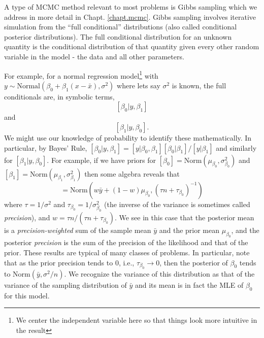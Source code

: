 A type of MCMC method relevant to most problems is Gibbs sampling 
\citep{geman_geman:1984} which we address in more detail in Chapt. \ref{chapt.mcmc}.
Gibbs sampling 
involves 
iterative simulation from the ``full
conditional'' 
distributions (also called conditional posterior
distributions). The full conditional distribution for an unknown
quantity is the conditional distribution of that quantity given every
other random variable in the model - the data and all other
parameters. 
For example, for a normal regression model\footnote{We center the 
independent variable here so that things look more intuitive in the result} with $y \sim
\mbox{Normal}(\beta_0 + \beta_1 (x-\bar{x}) , \sigma^{2})$
where lets say $\sigma^{2}$ is known, the full conditionals are, in symbolic terms,
\[
[\beta_0|y,\beta_1]
\]
 and
\[
[\beta_1|y,\beta_0].
\]
We might use our knowledge of probability to identify these
mathematically. In particular, by Bayes' Rule, $[\beta_0|y,\beta_1] =
[y|\beta_0,\beta_1][\beta_0|\beta_1]/[y|\beta_1]$ and similarly for
$[\beta_1|y,\beta_0]$. For example, if we have priors for 
$[\beta_0] = \mbox{Norm}(\mu_{\beta_0}, \sigma^{2}_{\beta_0})$ 
and 
$[\beta_1] = \mbox{Norm}(\mu_{\beta_1}, \sigma^{2}_{\beta_1})$ then
some algebra reveals that 
\begin{equation}
[\beta_0|y,\beta_1] = \mbox{Norm}\left(w \bar{y} + (1-w)\mu_{\beta_0},
(\tau n + \tau_{\beta_0})^{-1} \right)
\label{glms.eq.alpha}
\end{equation}
where $\tau = 1/\sigma^{2}$ and $\tau_{\beta_0} = 1/\sigma^{2}_{\beta_0}$
(the inverse of the variance is sometimes called {\it precision}), and
$w = \tau n/(\tau n + \tau_{\beta_0})$. We see in this case that the
posterior mean is a {\it precision-weighted} sum of the sample mean
$\bar{y}$ and the prior mean $\mu_{\beta_0}$, and the posterior {\it precision} 
is the sum of the precision of the likelihood and that of the
prior. These results are typical of many
classes of problems. In particular, note that as the prior precision
tends to 0, i.e., $\tau_{\beta_0} \rightarrow 0$, then the posterior of
$\beta_0$ tends to  $\mbox{Norm}(\bar{y}, \sigma^{2}/n)$. We recognize the 
variance of this distribution as that of the variance of the sampling
distribution of $\bar{y}$ and its mean is in fact the MLE of $\beta_0$
for this model. 
